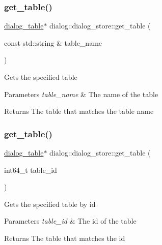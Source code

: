 \subsubsection{\texorpdfstring{get\+\_\+table()}{get\_table()}\hspace{0.1cm}{\footnotesize\ttfamily [1/2]}}
{\footnotesize\ttfamily \hyperlink{classdialog_1_1dialog__table}{dialog\+\_\+table}$\ast$ dialog\+::dialog\+\_\+store\+::get\+\_\+table (\begin{DoxyParamCaption}\item[{const std\+::string \&}]{table\+\_\+name }\end{DoxyParamCaption})\hspace{0.3cm}{\ttfamily [inline]}}

Gets the specified table 
\begin{DoxyParams}{Parameters}
{\em table\+\_\+name} & The name of the table \\
\hline
\end{DoxyParams}
\begin{DoxyReturn}{Returns}
The table that matches the table name 
\end{DoxyReturn}
\mbox{\label{classdialog_1_1dialog__store_a7fb7214a8098e54fd3d2ac0bfae4a431}} 
\subsubsection{\texorpdfstring{get\+\_\+table()}{get\_table()}\hspace{0.1cm}{\footnotesize\ttfamily [2/2]}}
{\footnotesize\ttfamily \hyperlink{classdialog_1_1dialog__table}{dialog\+\_\+table}$\ast$ dialog\+::dialog\+\_\+store\+::get\+\_\+table (\begin{DoxyParamCaption}\item[{int64\+\_\+t}]{table\+\_\+id }\end{DoxyParamCaption})\hspace{0.3cm}{\ttfamily [inline]}}

Gets the specified table by id 
\begin{DoxyParams}{Parameters}
{\em table\+\_\+id} & The id of the table \\
\hline
\end{DoxyParams}
\begin{DoxyReturn}{Returns}
The table that matches the id 
\end{DoxyReturn}
\mbox{\label{classdialog_1_1dialog__store_a749d49076f2107e32b65be5d79d5781c}} 
